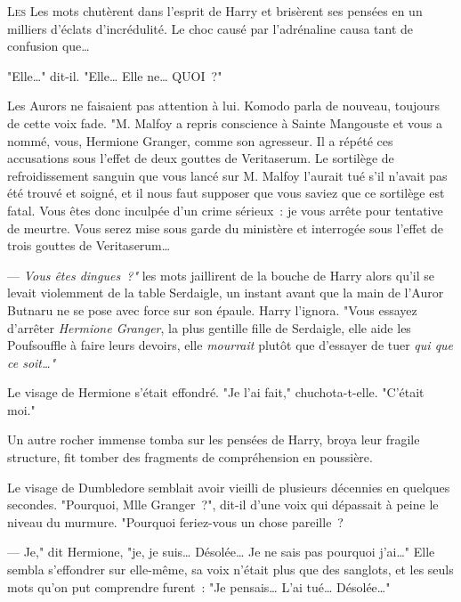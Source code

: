 
\lettrine{L}{es} Les mots chutèrent dans l'esprit de Harry et brisèrent ses pensées en un milliers d'éclats d'incrédulité. Le choc causé par l'adrénaline causa tant de confusion que…

"Elle…" dit-il. "Elle… Elle ne… QUOI~?"

Les Aurors ne faisaient pas attention à lui. Komodo parla de nouveau, toujours de cette voix fade. "M. Malfoy a repris conscience à Sainte Mangouste et vous a nommé, vous, Hermione Granger, comme son agresseur. Il a répété ces accusations sous l'effet de deux gouttes de Veritaserum. Le sortilège de refroidissement sanguin que vous lancé sur M. Malfoy l'aurait tué s'il n'avait pas été trouvé et soigné, et il nous faut supposer que vous saviez que ce sortilège est fatal. Vous êtes donc inculpée d'un crime sérieux~: je vous arrête pour tentative de meurtre. Vous serez mise sous garde du ministère et interrogée sous l'effet de trois gouttes de Veritaserum…

--- \emph{Vous êtes dingues~?"} les mots jaillirent de la bouche de Harry alors qu'il se levait violemment de la table Serdaigle, un instant avant que la main de l'Auror Butnaru ne se pose avec force sur son épaule. Harry l'ignora. "Vous essayez d'arrêter \emph{Hermione Granger}, la plus gentille fille de Serdaigle, elle aide les Poufsouffle à faire leurs devoirs, elle \emph{mourrait} plutôt que d'essayer de tuer \emph{qui que ce soit…"}

Le visage de Hermione s'était effondré. "Je l'ai fait," chuchota-t-elle. "C'était moi."

Un autre rocher immense tomba sur les pensées de Harry, broya leur fragile structure, fit tomber des fragments de compréhension en poussière.

Le visage de Dumbledore semblait avoir vieilli de plusieurs décennies en quelques secondes. "Pourquoi, Mlle Granger~?", dit-il d'une voix qui dépassait à peine le niveau du murmure. "Pourquoi feriez-vous un chose pareille~?

--- Je," dit Hermione, "je, je suis… Désolée… Je ne sais pas pourquoi j'ai…" Elle sembla s'effondrer sur elle-même, sa voix n'était plus que des sanglots, et les seuls mots qu'on put comprendre furent~: "Je pensais… L'ai tué… Désolée…"

